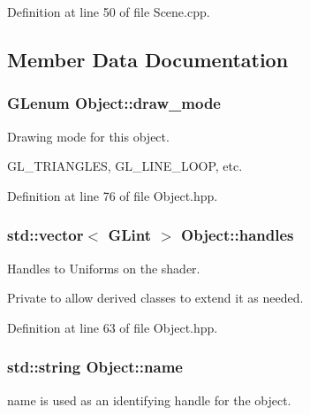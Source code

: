 Definition at line 50 of file Scene.\-cpp.



\subsection{Member Data Documentation}
\hypertarget{class_object_a82764b385767d989f27d301ab206acb8}{
\subsubsection[{draw\-\_\-mode}]{\setlength{\rightskip}{0pt plus 5cm}G\-Lenum Object\-::draw\-\_\-mode\hspace{0.3cm}{\ttfamily [protected]}}}\label{class_object_a82764b385767d989f27d301ab206acb8}


Drawing mode for this object. 

G\-L\-\_\-\-T\-R\-I\-A\-N\-G\-L\-E\-S, G\-L\-\_\-\-L\-I\-N\-E\-\_\-\-L\-O\-O\-P, etc. 

Definition at line 76 of file Object.\-hpp.

\hypertarget{class_object_acd6c7021617ea334915a1525f9519bc5}{
\subsubsection[{handles}]{\setlength{\rightskip}{0pt plus 5cm}std\-::vector$<$ G\-Lint $>$ Object\-::handles}}\label{class_object_acd6c7021617ea334915a1525f9519bc5}


Handles to Uniforms on the shader. 

Private to allow derived classes to extend it as needed. 

Definition at line 63 of file Object.\-hpp.

\hypertarget{class_object_a24457e0a387492c80594aec7681a2277}{
\subsubsection[{name}]{\setlength{\rightskip}{0pt plus 5cm}std\-::string Object\-::name\hspace{0.3cm}{\ttfamily [protected]}}}\label{class_object_a24457e0a387492c80594aec7681a2277}


name is used as an identifying handle for the object. 



